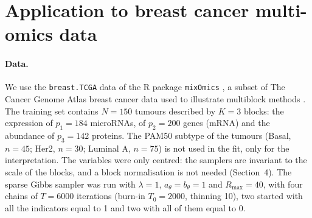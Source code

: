 \documentclass[11pt]{article}
\begin{document}
\section{Application to breast cancer multi-omics data}\label{sec:appli}
 
\paragraph{Data.} We use the \texttt{breast.TCGA} data of the \textsf{R} package \texttt{mixOmics} \citep{rohart2017}, a subset of The Cancer Genome Atlas breast cancer data \citep{tcga2012} used to illustrate multiblock methods \citep{singh2019}. The training set contains $N=150$ tumours described by $K=3$ blocks: the expression of $p_1=184$ microRNAs, of $p_2=200$ genes (mRNA) and the abundance of $p_3=142$ proteins. The PAM50 subtype of the tumours (Basal, $n=45$; Her2, $n=30$; Luminal A, $n=75$) is not used in the fit, only for the interpretation. The variables were only centred: the samplers are invariant to the scale of the blocks, and a block normalisation is not needed (Section~4). The sparse Gibbs sampler was run with $\lambda=1$, $a_\theta=b_\theta=1$ and $R_{\max}=40$, with four chains of $T=6000$ iterations (burn-in $T_0=2000$, thinning 10), two started with all the indicators equal to 1 and two with all of them equal to 0.
 
\end{document}
